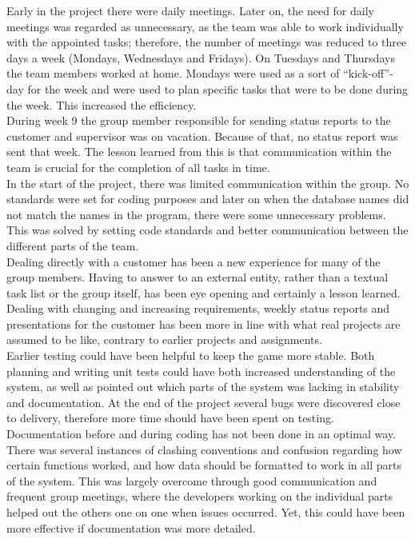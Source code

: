 Early in the project there were daily meetings. Later on, the need for daily meetings was regarded as unnecessary, as the team was able to work individually with the appointed tasks; therefore, the number of meetings was reduced to three days a week (Mondays, Wednesdays and Fridays). On Tuesdays and Thursdays the team members worked at home. Mondays were used as a sort of “kick-off”-day for the week and were used to plan specific tasks that were to be done during the week. This increased the efficiency.\\
\newline
During week 9 the group member responsible for sending status reports to the customer and supervisor was on vacation. Because of that, no status report was sent that week. The lesson learned from this is that communication within the team is crucial for the completion of all tasks in time.\\
\newline
In the start of the project, there was limited communication within the group. No standards were set
for coding purposes and later on when the database names did not match the names in the program, there were some unnecessary problems. This was solved by setting code standards and better communication between the different parts of the team. \\
\newline
Dealing directly with a customer has been a new experience for many of the group members. Having to answer to an external entity, rather than a textual task list or the group itself, has been eye opening and certainly a lesson learned. Dealing with changing and increasing requirements, weekly status reports and presentations for the customer has been more in line with what real projects are assumed to be like, contrary to earlier projects and assignments.\\
\newline
Earlier testing could have been helpful to keep the game more stable. Both planning and writing unit tests could have both increased understanding of the system, as well as pointed out which parts of the system was lacking in stability and documentation. At the end of the project several bugs were discovered close to delivery, therefore more time should have been spent on testing.\\
\newline
Documentation before and during coding has not been done in an optimal way. There was several instances of clashing conventions and confusion regarding how certain functions worked, and how data should be formatted to work in all parts of the system. This was largely overcome through good communication and frequent group meetings, where the developers working on the individual parts helped out the others one on one when issues occurred. Yet, this could have been more effective if documentation was more detailed.
\\





